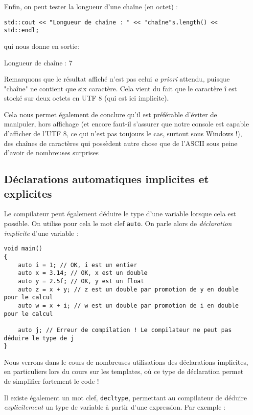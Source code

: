 Enfin, on peut tester la longueur d'une chaîne (en octet) : 
\begin{lstlisting}
std::cout << "Longueur de chaîne : " << "chaîne"s.length() << std::endl;
\end{lstlisting}
qui nous donne en sortie:
\begin{inverseverbatim}
Longueur de chaîne : 7
\end{inverseverbatim}

Remarquons que le résultat affiché n'est pas celui \textsl{a priori} attendu, puisque "chaîne" ne contient que six
caractère. Cela vient du fait que le caractère $î$ est stocké sur deux octets en UTF 8 (qui est ici implicite).

Cela nous permet également de conclure qu'il est préférable d'éviter de manipuler, hors affichage (et encore faut-il s'assurer que notre console est capable d'afficher de l'UTF 8, ce qui n'est pas toujours le cas, surtout sous Windows !), des chaînes de caractères qui possèdent autre chose que de l'ASCII sous peine d'avoir de nombreuses surprises

\subsection{Déclarations automatiques implicites et explicites}



Le compilateur peut également déduire le type d'une variable lorsque cela est possible. On utilise pour cela le mot clef
\texttt{auto}. On parle alors de \textsl{déclaration implicite} d'une variable :

\begin{lstlisting}[caption=Exemple d'utilisation d'une déclaration implicite]
void main()
{
    auto i = 1; // OK, i est un entier
    auto x = 3.14; // OK, x est un double
    auto y = 2.5f; // OK, y est un float
    auto z = x + y; // z est un double par promotion de y en double pour le calcul
    auto w = x + i; // w est un double par promotion de i en double pour le calcul

    auto j; // Erreur de compilation ! Le compilateur ne peut pas déduire le type de j
}
\end{lstlisting}

Nous verrons dans le cours de nombreuses utilisations des déclarations implicites, en particuliers lors du cours sur les templates, où ce type de déclaration permet de simplifier fortement le code !

Il existe également un mot clef, \texttt{decltype}, permettant au compilateur de déduire \textsl{explicitement} un type de variable à partir d'une expression. Par exemple :

